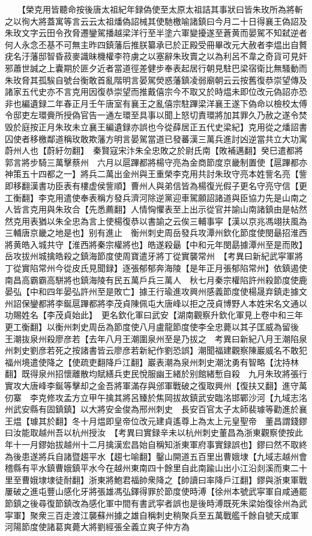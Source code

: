 　　【榮克用皆聽命按後唐太祖紀年録偽使至太原太祖詰其事狀曰皆朱玫所為將斬之以徇大將蓋寓等言云云太祖燔偽詔械其使馳檄喻諸鎮曰今月二十日得襄王偽詔及朱玫文字云田令孜脅遷鑾駕播越梁洋行至半塗六軍變擾遂至蒼黄而晏駕不知弑逆者何人永念丕基不可無主昨四鎮藩后推朕纂承已於正殿受冊畢改元大赦者李煴出自贅疣名汙藩邸智昏菽麥識昧機權李符虜之以塞辭朱玫賣之以為利呂不韋之奇貨可見奸邪蕭世誠之上囊期於匪夕近者當道徑差健步奉表起居行朝見駐巴梁宿衛比無騷動而朱玫脅其孤騃自號台衡敢首亂階明言晏駕熒惑藩鎮凌弱廟朝云云按舊復恭崇望傳及諸家五代史亦不言克用因復恭崇望而推戴僖宗今不取又於時煴未即位改元偽詔亦恐非也編遺録二年春正月壬午唐室有襄王之亂僖宗駐蹕梁洋襄王遂下偽命以檢校太傅令邸吏左環賫所授偽官告一通左環至具事以聞上怒切責環將加其罪久乃赦之遂令焚毁於庭按正月朱玫未立襄王編遺録亦誤也今從薛居正五代史梁紀】克用從之燔詔書囚使者移檄鄰道稱玫敢欺藩方明言晏駕當道已發蕃漢三萬兵進討凶逆當共立大功寓蔚州人也【蔚紆勿翻】　秦賢寇宋汴朱全忠敗之於尉氏南【敗補邁翻】癸巳遣都將郭言將步騎三萬擊蔡州　六月以扈蹕都將楊守亮為金商節度京畿制置使【扈蹕都亦神策五十四都之一】將兵二萬出金州與王重榮李克用共討朱玫守亮本姓訾名亮【訾即移翻漢書功臣表有樓虚侯訾順】曹州人與弟信皆為楊復光假子更名守亮守信【更工衡翻】李克用遣使奉表稱方發兵濟河除逆黨迎車駕願詔諸道與臣協力先是山南之人皆言克用與朱玫合【先悉薦翻】人情恟懼表至上出示從官并諭山南諸鎮由是帖然然克用表猶以朱全忠為言上使楊復恭以書諭之云俟三輔事寜【漢以京兆馮翊扶風為三輔唐京畿之地是也】别有進止　衡州刺史周岳發兵攻潭州欽化節度使閔朂招淮西將黄皓入城共守【淮西將秦宗權將也】皓遂殺朂【中和元年閔勗據潭州至是而敗】岳攻拔州城擒皓殺之鎮海節度使周寶遣牙將丁從實襲常州　【考異曰新紀武寜軍將丁從實陷常州今從皮氏見聞録】逐張郁郁奔海陵【是年正月張郁陷常州】依鎮遏使南昌高霸霸高駢將也鎮海陵有民五萬戶兵三萬人　秋七月秦宗權陷許州殺節度使鹿晏弘【中和四年晏弘許州至是敗亡】據王行瑜進攻興州感義節度使楊晟弃鎮走據文州詔保鑾都將李鋋扈蹕都將李茂貞陳佩屯大唐峰以拒之茂貞博野人本姓宋名文通以功賜姓名【李茂貞始此】　更名欽化軍曰武安【湖南觀察升欽化軍見上卷中和三年更工衡翻】以衡州刺史周岳為節度使八月盧龍節度使李全忠薨以其子匡威為留後　王潮抜泉州殺廖彦若【去年八月王潮圍泉州至是乃拔之　考異曰新紀八月王潮陷泉州刺史劉彦若死之按諸書皆云廖彦若新紀作劉恐誤】潮聞福建觀察陳巖威名不敢犯福州境遣使降之【使疏吏翻降戶江翻】巖表潮為泉州刺史潮沈勇有智略【沈持林翻】既得泉州招懷離散均賦繕兵吏民悅服幽王緒於别館緒慙自殺　九月朱玫將張行實攻大唐峰李鋋等擊却之金吾將軍滿存與邠軍戰破之復取興州【復扶又翻】進守萬仞寨　李克修攻孟方立甲午擒其將呂臻於焦岡拔故鎮武安臨洺邯鄲沙河【九域志洺州武安縣有固鎮鎮】以大將安金俊為邢州刺史　長安百官太子太師裴璩等勸進於襄王煴【璩其於翻】冬十月煴即皇帝位改元建貞遙尊上為太上元皇聖帝　董昌謂錢鏐曰汝能取越州吾以杭州授汝　【考異曰實録辛未以杭州刺史董昌為浙東觀察使按此年十一月鏐始拔越州十二月擒漢宏昌始自稱知浙東軍府事實録誤也】鏐曰然不取終為後患遂將兵自諸暨趨平水【趨七喻翻】鑿山開道五百里出曹娥埭【九域志越州會稽縣有平水鎮曹娥鎮平水今在越州東南四十餘里自此南踰山出小江沿剡溪而東二十里至曹娥埭埭徒耐翻】浙東將鮑君福帥衆降之【帥讀曰率降戶江翻】鏐與浙東軍戰屢破之進屯豐山感化牙將張雄馮弘鐸得罪於節度使時溥【徐州本號武寜軍自咸通罷節鎮之後尋復節鎮改為感化軍中間有書武寜者誤也是後時溥既死朱梁始復徐州為武寜軍】聚衆三百走渡江襲蘇州據之雄自稱刺史稍聚兵至五萬戰艦千餘自號天成軍　河陽節度使諸葛爽薨大將劉經張全義立爽子仲方為